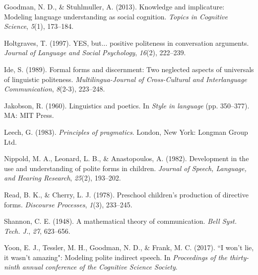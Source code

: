 \documentclass[10pt, letterpaper]{article}
\begin{document}
\hypertarget{ref-goodman2013}{}
Goodman, N. D., \& Stuhlmuller, A. (2013). Knowledge and implicature:
Modeling language understanding as social cognition. \emph{Topics in
Cognitive Science}, \emph{5}(1), 173--184.

\hypertarget{ref-holtgraves1997}{}
Holtgraves, T. (1997). YES, but... positive politeness in conversation
arguments. \emph{Journal of Language and Social Psychology},
\emph{16}(2), 222--239.

\hypertarget{ref-ide1989}{}
Ide, S. (1989). Formal forms and discernment: Two neglected aspects of
universals of linguistic politeness. \emph{Multilingua-Journal of
Cross-Cultural and Interlanguage Communication}, \emph{8}(2-3),
223--248.

\hypertarget{ref-jakobson1960}{}
Jakobson, R. (1960). Linguistics and poetics. In \emph{Style in
language} (pp. 350--377). MA: MIT Press.

\hypertarget{ref-leech1983}{}
Leech, G. (1983). \emph{Principles of pragmatics}. London, New York:
Longman Group Ltd.

\hypertarget{ref-nippold1982}{}
Nippold, M. A., Leonard, L. B., \& Anastopoulos, A. (1982). Development
in the use and understanding of polite forms in children. \emph{Journal
of Speech, Language, and Hearing Research}, \emph{25}(2), 193--202.

\hypertarget{ref-read1978}{}
Read, B. K., \& Cherry, L. J. (1978). Preschool children's production of
directive forms. \emph{Discourse Processes}, \emph{1}(3), 233--245.

\hypertarget{ref-shannon1948}{}
Shannon, C. E. (1948). A mathematical theory of communication.
\emph{Bell Syst. Tech. J.}, \emph{27}, 623--656.

\hypertarget{ref-yoon2017}{}
Yoon, E. J., Tessler, M. H., Goodman, N. D., \& Frank, M. C. (2017). ``I
won't lie, it wasn't amazing": Modeling polite indirect speech. In
\emph{Proceedings of the thirty-ninth annual conference of the Cognitive
Science Society}.
\end{document}

